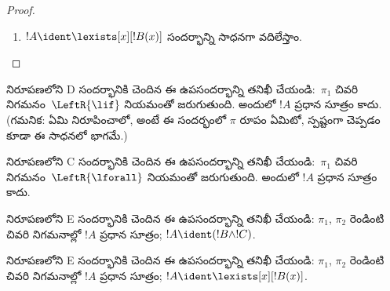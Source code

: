 \documentclass[../../../include/open-logic-section]{subfiles}
\begin{document}
\begin{proof}
\begin{enumerate}
~$\pi_1'$ తుది సీక్వెంట్ $\Gamma \Sequent \Delta,
!B(c)$; ఇక్కడ $c$ ఒక~$\RightR{\lforall}$ నిగమనానికి ఈగెన్‌చరం. కాబట్టి $c$ అనేది~$!B(x)$, $\Gamma$,~$\Delta$లలో కనిపించదు. ~$\pi$ క్రమబద్ధమైనదని అనుకుందాం. అప్పుడు $c$ అనేది తరువాత వచ్చే ఒక్క~$\RightR{\lforall}$ నిగమనానికే ఈగెన్‌చరం; అది ఆ నిగమనం పైనే, అంటే~$\pi_1'$లో మాత్రమే, కనిపిస్తుంది; $\pi_1'$లోని మరొక నిగమనానికి ఈగెన్‌చరం కాదు. $c$ అనేది~$\pi_2$లో కనిపించదు కనుక~$t$లోనూ ఉండదు.  ప్రకారం ~$\Subst{\pi_1'}{t}{c}$ అనేది $\Gamma \Sequent \Delta,
!B(t)$కు . ఇప్పుడు ఆగమన పరికల్పనను ఈ  వర్తింపజేస్తాం:
\[
\AxiomC{}
\RightLabel{$\Subst{\pi_1'}{t}{c}$}
\Deduce$\Gamma \fCenter \Delta, !B(t)$
\AxiomC{}
\RightLabel{$\pi_2''$}
\Deduce$!B(t), \Gamma \fCenter \Delta$
\RightLabel{\CutCS}
\BinaryInf$\Gamma \fCenter \Delta$
\DisplayProof
\]
(కట్ ~$!B(t)$ కనుక ఈ కు~$\pi$కన్నా తక్కువ కట్ స్థాయి ఉంది; అందువల్ల ఆగమన పరికల్పన వర్తిస్తుంది.)
\item $!A \ident \lexists[x][!B(x)]$ సందర్భాన్ని సాధనగా వదిలేస్తాం.
\end{enumerate}
\end{proof}

\begin{prob}
 నిరూపణలోని D సందర్భానికి చెందిన ఈ ఉపసందర్భాన్ని తనిఖీ చేయండి:~$\pi_1$ చివరి నిగమనం~$\LeftR{\lif}$ నియమంతో జరుగుతుంది. అందులో $!A$ ప్రధాన సూత్రం కాదు. (గమనిక: ఏమి నిరూపించాలో, అంటే ఈ సందర్భంలో $\pi$ రూపం ఏమిటో, స్పష్టంగా చెప్పడం కూడా ఈ సాధనలో భాగమే.)
\end{prob}

\begin{prob}
 నిరూపణలోని C సందర్భానికి చెందిన ఈ ఉపసందర్భాన్ని తనిఖీ చేయండి:~$\pi_1$ చివరి నిగమనం~$\LeftR{\lforall}$ నియమంతో జరుగుతుంది. అందులో $!A$ ప్రధాన సూత్రం కాదు.
\end{prob}

\begin{prob}
 నిరూపణలోని E సందర్భానికి చెందిన ఈ ఉపసందర్భాన్ని తనిఖీ చేయండి: $\pi_1$, $\pi_2$ రెండింటి చివరి నిగమనాల్లో $!A$ ప్రధాన సూత్రం; $!A \ident (!B \land !C)$.
\end{prob}

\begin{prob}
 నిరూపణలోని E సందర్భానికి చెందిన ఈ ఉపసందర్భాన్ని తనిఖీ చేయండి: $\pi_1$, $\pi_2$ రెండింటి చివరి నిగమనాల్లో $!A$ ప్రధాన సూత్రం; $!A \ident \lexists[x][!B(x)]$.
\end{prob}
\end{document}
